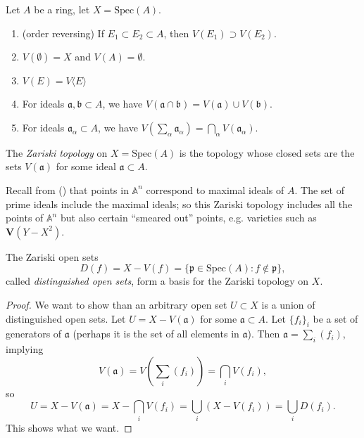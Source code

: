 \documentclass[12pt]{article}
\begin{document}
\begin{proposition}
	Let $A$ be a ring, let $X=\text{Spec}(A)$.
	\begin{enumerate}
		\item (order reversing) If $E_1\subset E_2\subset A$, then $V(E_1)\supset V(E_2)$.
		\item $V(\emptyset) = X$ and $V(A)=\emptyset$.
		\item $V(E)=V\langle E\rangle$
		\item For ideals $\mathfrak{a},\mathfrak{b}\subset A$, we have $V(\mathfrak{a}\cap\mathfrak{b})=V(\mathfrak{a})\cup V(\mathfrak{b})$.
		\item For ideals $\mathfrak{a}_\alpha\subset A$, we have $V(\sum_\alpha \mathfrak{a}_\alpha) = \bigcap_\alpha V(\mathfrak{a}_\alpha)$.
	\end{enumerate}
\end{proposition}

\begin{definition}
	The \emph{Zariski topology} on $X=\text{Spec}(A)$ is the topology whose closed sets are the sets $V(\mathfrak{a})$ for some ideal $\mathfrak{a}\subset A$.
\end{definition}

\begin{remark}
	Recall from () that points in $\mathbb{A}^n$ correspond to maximal ideals of $A$. The set of prime ideals include the maximal ideals; so this Zariski topology includes all the points of $\mathbb{A}^n$ but also certain ``smeared out'' points, e.g. varieties such as $\mathbf{V}(Y-X^2)$.
\end{remark}

\begin{proposition}
	The Zariski open sets 
	\begin{equation*}
		D(f) = X - V(f) = \{\mathfrak{p}\in\text{Spec}(A) : f\not\in \mathfrak{p} \},
	\end{equation*}
	called \emph{distinguished open sets}, form a basis for the Zariski topology on $X$.
\end{proposition}
\begin{proof}
	We want to show than an arbitrary open set $U\subset X$ is a union of distinguished open sets. Let $U=X-V(\mathfrak{a})$ for some $\mathfrak{a}\subset A$. Let $\{f_i\}_i$ be a set of generators of $\mathfrak{a}$ (perhaps it is the set of all elements in $\mathfrak{a}$). Then $\mathfrak{a} = \sum_i (f_i)$, implying
	\begin{equation*}
		V(\mathfrak{a}) = V(\sum_i (f_i)) = \bigcap_i V(f_i),
	\end{equation*}
	so 
	\begin{equation*}
		U = X-V(\mathfrak{a}) = X-\bigcap_i V(f_i) = \bigcup_i (X-V(f_i)) = \bigcup_i D(f_i).
	\end{equation*}
	This shows what we want.
\end{proof}
\end{document}
